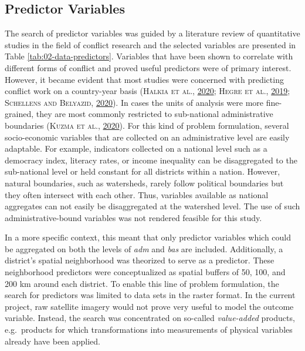 \documentclass[a4paper,11pt]{article}
\begin{document}
\hypertarget{predictor-variables}{%
\subsection{Predictor Variables}\label{predictor-variables}}

The search of predictor variables was guided by a literature review of quantitative
studies in the field of conflict research and the selected variables are presented
in Table \ref{tab:02-data-predictors}. Variables that have been shown to correlate
with different forms of conflict and proved useful predictors were of primary
interest. However, it became evident that most studies were concerned
with predicting conflict work on a country-year basis \textsc{(\textnormal{\textsc{Halkia} \textsc{et al.}}, \textnormal{\protect\hyperlink{ref-halkia2020a}{2020}}; \textnormal{\textsc{Hegre} \textsc{et al.}}, \textnormal{\protect\hyperlink{ref-hegre2019}{2019}}; \textnormal{\textsc{Schellens} and \textsc{Belyazid}}, \textnormal{\protect\hyperlink{ref-schellens2020}{2020}})}.
In cases the units of analysis were more fine-grained, they are most commonly
restricted to sub-national administrative boundaries \textsc{(\textnormal{\textsc{Kuzma} \textsc{et al.}}, \textnormal{\protect\hyperlink{ref-kuzma2020}{2020}})}. For this kind
of problem formulation, several socio-economic variables that are collected on an
administrative level are easily adaptable. For example, indicators collected on
a national level such as a democracy index, literacy rates, or income inequality
can be disaggregated to the sub-national level or held constant for all districts
within a nation. However, natural boundaries, such as watersheds, rarely follow
political boundaries but they often intersect with each other.
Thus, variables available as national aggregates can not easily be disaggregated at
the watershed level. The use of such administrative-bound variables was not rendered feasible for this study.

In a more specific context, this meant that only predictor variables which could
be aggregated on both the levels of \emph{adm} and \emph{bas} are included.
Additionally, a district's spatial neighborhood was theorized to serve as a predictor.
These neighborhood predictors were conceptualized as spatial buffers of 50, 100,
and 200 km around each district. To enable this line of problem formulation, the
search for predictors was limited to data sets in the raster format. In the
current project, raw satellite imagery would not prove very useful to model the
outcome variable. Instead, the search was concentrated on so-called \emph{value-added}
products, e.g.~products for which transformations into measurements of physical
variables already have been applied.
\end{document}
